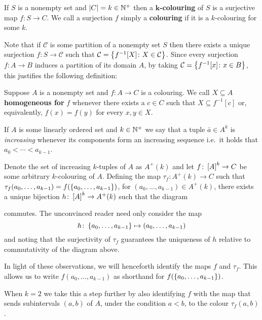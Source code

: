\begin{dfn}[Colouring]\label{def:Col}
	If $S$ is a nonempty set and $\card{C}=k\in\posnats$ then a
	$\mathbf{k}$\textbf{-colouring} of $S$ is a surjective map $f\colon  S\to
	C$.  We call a surjection $f$ simply a \textbf{colouring} if it is a
	$k$-colouring for some $k$.
\end{dfn}

Note that if $\mathcal{C}$ is some partition of a nonempty set $S$ then there
exists a unique surjection $f\colon S\to \mathcal{C}$ such that
$\mathcal{C}=\setbuild{f^{-1}[X]}{X\in \mathcal{C}}$. Since every surjection
$f\colon A\to B$ induces a partition of its domain $A$, by taking
$\mathcal{C}=\setbuild{f^{-1}[x]}{x\in B}$, this justifies the following
definition:

\begin{dfn}
	Suppose $A$ is a nonempty set and $f\colon A\to C$ is a colouring.  We call
	$X\subseteq A$ \textbf{homogeneous for} $f$ whenever there exists a $c\in
	C$ such that $X\subseteq f^{-1}[c]$ or, equivalently, $f(x)=f(y)$ for every
	$x,y\in X$.
\end{dfn}

If $A$ is some linearly ordered set and $k\in\posnats$ we say that a tuple
$\bar{a}\in A^k$ is \textit{increasing} whenever its components form an
increasing sequence i.e.\ it holds that $a_0<\dotsb<a_{k-1}$.

Denote the set of increasing $k$-tuples of $A$ as $A^+(k)$ and let $f\colon
\subsets{k}{A}\to C$ be some arbitrary $k$-colouring of $A$.  Defining the map
$\tau_f\colon A^+(k)\to C$ such that
$\tau_f(a_0,\dotsc,a_{k-1})=f(\set{a_0,\dotsc,a_{k-1}})$, for
$(a_0,\dotsc,a_{k-1})\in A^+(k)$, there exists a unique bijection $h\colon
\subsets{k}{A}\to A^+(k)$ such that the diagram
\begin{center}
\end{center}
commutes.  The unconvinced reader need only consider the map
\begin{equation}
	h\colon\set{a_0,\dotsc,a_{k-1}}\mapsto(a_0,\dotsc,a_{k-1})
\end{equation}
and noting that the surjectivity of $\tau_f$ guarantees the uniqueness of $h$
relative to commutativity of the diagram above.

\begin{conv}[Colourings]\label{rem:Col}
	In light of these observations, we will henceforth identify the maps $f$ and
	$\tau_f$.  This allows us to write $f(a_0,\dotsc,a_{k-1})$ as
	shorthand for $f(\set{a_0,\dotsc,a_{k-1}})$.

	When $k=2$ we take this a step further by also identifying $f$ with the map
	that sends subintervals $(a,b)$ of $A$, under the condition $a<b$, to the
	colour $\tau_f(a,b)$.
\end{conv}

